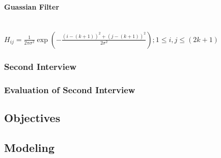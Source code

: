 \begin{flushleft}
\begin{math}
            \end{math}
            \bk

            \bk
            \paragraph{Guassian Filter}
            \mbox{} \\
            
            \bk
            \begin{math}
                H_{ij} = \frac{1}{2\pi\sigma^{2}} \exp (-\frac{(i - (k + 1))^{2} + (j - (k + 1))^{2}}{2\sigma^{2}});1\leq i, j \leq(2k+1)
            \end{math}
            \bk
            
            \bk
            \subsubsection{Second Interview}

            \subsubsection{Evaluation of Second Interview}

        \subsection{Objectives}

        \subsection{Modeling}

        \bk

\end{flushleft}